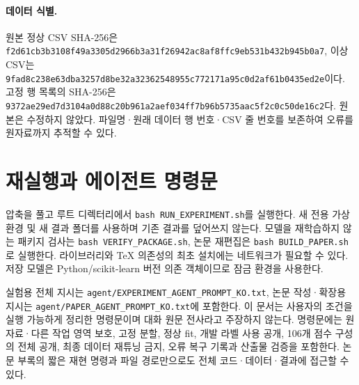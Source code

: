 \documentclass{article}
\newcommand{\code}[1]{\texttt{\small #1}}
\begin{document}
\paragraph{데이터 식별.}
원본 정상 CSV SHA-256은 \texttt{\scriptsize f2d61cb3b3108f49a3305d2966b3a31f26942ac8af8ffc9eb531b432b945b0a7}, 이상 CSV는 \texttt{\scriptsize 9fad8c238e63dba3257d8be32a32362548955c772171a95c0d2af61b0435ed2e}이다. 고정 행 목록의 SHA-256은 \texttt{\scriptsize 9372ae29ed7d3104a0d88c20b961a2aef034ff7b96b5735aac5f2c0c50de16c2}다. 원본은 수정하지 않았다. 파일명·원래 데이터 행 번호·CSV 줄 번호를 보존하여 오류를 원자료까지 추적할 수 있다.

\section{재실행과 에이전트 명령문}
압축을 풀고 루트 디렉터리에서 \code{bash RUN\_\allowbreak EXPERIMENT.sh}를 실행한다. 새 전용 가상환경 및 새 결과 폴더를 사용하며 기존 결과를 덮어쓰지 않는다. 모델을 재학습하지 않는 패키지 검사는 \code{bash VERIFY\_\allowbreak PACKAGE.sh}, 논문 재편집은 \code{bash BUILD\_\allowbreak PAPER.sh}로 실행한다. 라이브러리와 TeX 의존성의 최초 설치에는 네트워크가 필요할 수 있다. 저장 모델은 Python/scikit-learn 버전 의존 객체이므로 잠금 환경을 사용한다.

실험용 전체 지시는 \code{agent/\allowbreak EXPERIMENT\_\allowbreak AGENT\_\allowbreak PROMPT\_\allowbreak KO.txt}, 논문 작성·확장용 지시는 \code{agent/\allowbreak PAPER\_\allowbreak AGENT\_\allowbreak PROMPT\_\allowbreak KO.txt}에 포함한다. 이 문서는 사용자의 조건을 실행 가능하게 정리한 명령문이며 대화 원문 전사라고 주장하지 않는다. 명령문에는 원자료·다른 작업 영역 보호, 고정 분할, 정상 fit, 개발 라벨 사용 공개, 106개 점수 구성의 전체 공개, 최종 데이터 재튜닝 금지, 오류 복구 기록과 산출물 검증을 포함한다. 논문 부록의 짧은 재현 명령과 파일 경로만으로도 전체 코드·데이터·결과에 접근할 수 있다.
\end{document}
